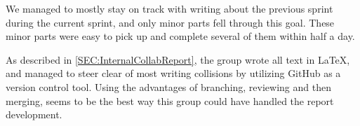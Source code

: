 We managed to mostly stay on track with writing about the previous sprint during the current sprint, and only minor parts fell through this goal.
These minor parts were easy to pick up and complete several of them within half a day.

As described in \autoref{SEC:InternalCollabReport}, the group wrote all text in \LaTeX, and managed to steer clear of most writing collisions by utilizing GitHub as a version control tool.
Using the advantages of branching, reviewing and then merging, seems to be the best way this group could have handled the report development.
